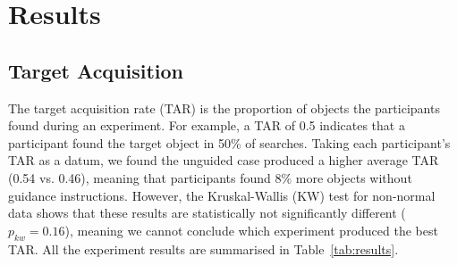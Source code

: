 \documentclass[runningheads]{llncs}
\begin{document}



\section{Results}\label{sec:results}

\subsection{Target Acquisition}


The target acquisition rate (TAR) is the proportion of objects the participants found during an experiment. 
For example, a TAR of 0.5 indicates that a participant found the target object in 50\% of searches. 
Taking each participant's TAR as a datum, we found the unguided case produced a higher average TAR (0.54 vs. 0.46), meaning that participants found 8\% more objects without guidance instructions.
However, the Kruskal-Wallis (KW) test for non-normal data shows that these results are statistically not significantly different ($p_{kw} = 0.16$), meaning we cannot conclude which experiment produced the best TAR. 
All the experiment results are summarised in Table~\ref{tab:results}. 
\end{document}
